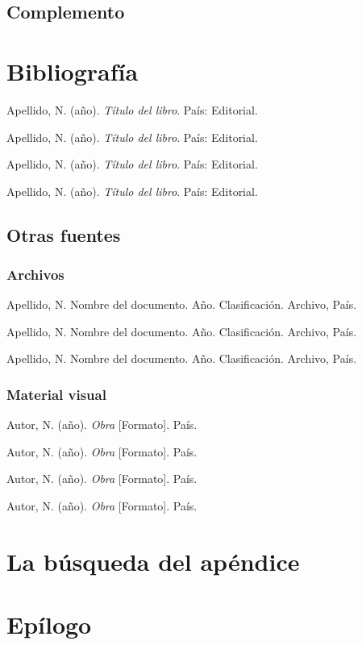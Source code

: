 \documentclass[12pt,c5paper,oneside]{book} %
\begin{document}
\lipsum[1-10]

\section{Complemento}

\lipsum[2-3]


\chapter*{Bibliografía}

Apellido, N. (año). \emph{Título del libro}. País: Editorial.

Apellido, N. (año). \emph{Título del libro}. País: Editorial.

Apellido, N. (año). \emph{Título del libro}. País: Editorial.

Apellido, N. (año). \emph{Título del libro}. País: Editorial.

\clearpage{\pagestyle{empty}\cleardoublepage}

\section*{Otras fuentes}
\subsection*{Archivos}

Apellido, N. Nombre del documento. Año. Clasificación. Archivo, País.

Apellido, N. Nombre del documento. Año. Clasificación. Archivo, País.

Apellido, N. Nombre del documento. Año. Clasificación. Archivo, País.

\subsection*{Material visual}

Autor, N. (año). \emph{Obra} [Formato]. País.

Autor, N. (año). \emph{Obra} [Formato]. País.

Autor, N. (año). \emph{Obra} [Formato]. País.

Autor, N. (año). \emph{Obra} [Formato]. País.

\appendix


\chapter{La búsqueda del apéndice}

\lipsum[1-6]

\backmatter

\chapter{Epílogo}

\lipsum[1-6]
\end{document}
